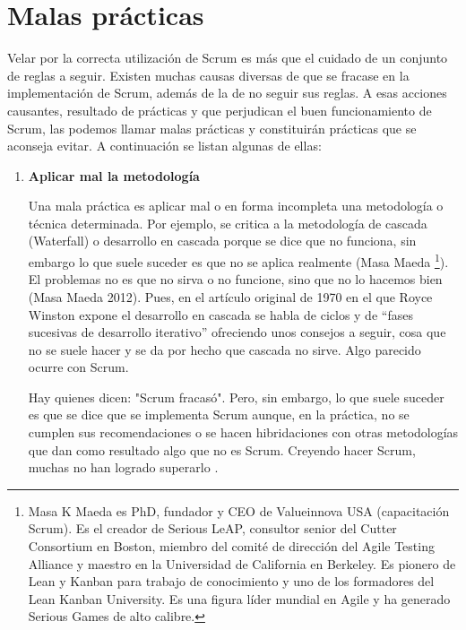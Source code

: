 
\chapter{Malas prácticas}

Velar por la correcta utilización de Scrum es más que el cuidado de un conjunto de reglas a seguir. Existen muchas causas diversas de que se fracase en la implementación de Scrum, además de la de no seguir sus reglas. A esas acciones causantes, resultado de prácticas y que perjudican el buen funcionamiento de Scrum, las podemos llamar malas prácticas y constituirán prácticas que se aconseja evitar.
A continuación se listan algunas de ellas:

\begin{enumerate}

\item \textbf{Aplicar mal la metodología}

Una mala práctica es aplicar mal o en forma incompleta una metodología o técnica determinada. Por ejemplo, se critica a la metodología de cascada (Waterfall) o desarrollo en cascada porque se dice que no funciona, sin embargo lo que suele suceder es que no se aplica realmente (Masa Maeda \footnote{Masa K Maeda es PhD, fundador y CEO de Valueinnova USA (capacitación Scrum). Es el creador de Serious LeAP, consultor senior del Cutter Consortium en Boston, miembro del comité de dirección del Agile Testing Alliance y maestro en la Universidad de California en Berkeley. Es pionero de Lean y Kanban para trabajo de conocimiento y uno de los formadores del Lean Kanban University. Es una figura líder mundial en Agile y ha generado Serious Games de alto calibre.}). El problemas no es que no sirva o no funcione, sino que no lo hacemos bien (Masa Maeda  2012). Pues, en el artículo original de 1970 en el que Royce Winston expone el desarrollo en cascada se habla de ciclos y de “fases sucesivas de desarrollo iterativo” \cite{Winston-Royce-1970} ofreciendo unos consejos a seguir, cosa que no se suele hacer y se da por hecho que cascada no sirve. Algo parecido ocurre con Scrum.

Hay quienes dicen:  "Scrum fracasó". Pero, sin embargo, lo que suele suceder es que se dice que se implementa Scrum aunque, en la práctica, no se cumplen sus recomendaciones o se hacen hibridaciones con otras metodologías que dan como resultado algo que no es Scrum. Creyendo hacer Scrum, muchas no han logrado superarlo \cite{Gantthead-James-2010}.  


\end{enumerate}
